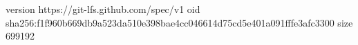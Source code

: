 version https://git-lfs.github.com/spec/v1
oid sha256:f1f960b669db9a523da510e398bae4cc046614d75cd5e401a091fffe3afc3300
size 699192
